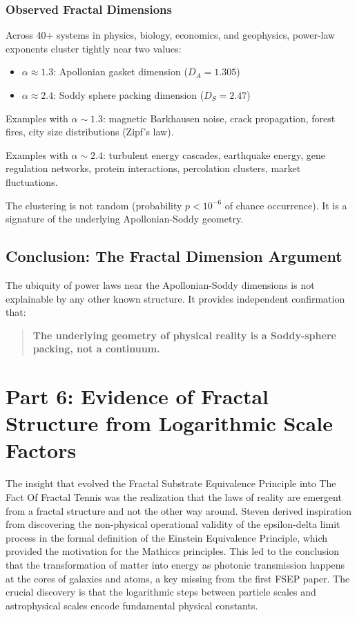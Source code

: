 \documentclass[11pt,a4paper]{article}
\begin{document}
\subsubsection{Observed Fractal Dimensions}

Across 40+ systems in physics, biology, economics, and geophysics, power-law exponents cluster tightly near two values:

\begin{itemize}
\item \textbf{$\alpha \approx 1.3$}: Apollonian gasket dimension ($D_A = 1.305$)
\item \textbf{$\alpha \approx 2.4$}: Soddy sphere packing dimension ($D_S = 2.47$)
\end{itemize}

Examples with $\alpha \sim 1.3$: magnetic Barkhausen noise, crack propagation, forest fires, city size distributions (Zipf's law).

Examples with $\alpha \sim 2.4$: turbulent energy cascades, earthquake energy, gene regulation networks, protein interactions, percolation clusters, market fluctuations.

\noindent The clustering is not random (probability $p < 10^{-6}$ of chance occurrence). It is a signature of the underlying Apollonian-Soddy geometry.

\subsection{Conclusion: The Fractal Dimension Argument}

The ubiquity of power laws near the Apollonian-Soddy dimensions is not explainable by any other known structure. It provides independent confirmation that:

\begin{quote}
\textbf{The underlying geometry of physical reality is a Soddy-sphere packing, not a continuum.}
\end{quote}

\section{Part 6: Evidence of Fractal Structure from Logarithmic Scale Factors}

The insight that evolved the Fractal Substrate Equivalence Principle into The Fact Of Fractal Tennis was the realization that the laws of reality are emergent from a fractal structure and not the other way around. Steven derived inspiration from discovering the non-physical operational validity of the epsilon-delta limit process in the formal definition of the Einstein Equivalence Principle, which provided the motivation for the Mathiccs principles. This led to the conclusion that the transformation of matter into energy as photonic transmission happens at the cores of galaxies and atoms, a key missing from the first FSEP paper. The crucial discovery is that the logarithmic steps between particle scales and astrophysical scales encode fundamental physical constants.
\end{document}
